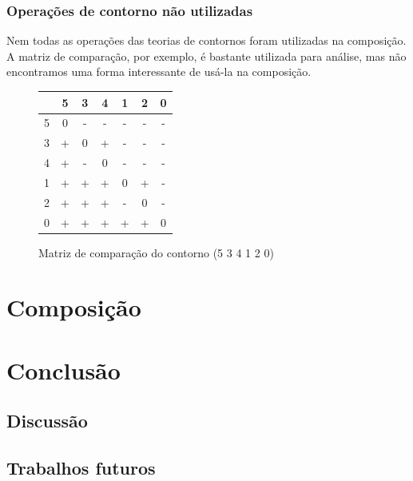 \subsection{Operações de contorno não utilizadas}
\label{sec:oper-de-cont}

Nem todas as operações das teorias de contornos foram utilizadas na
composição. A matriz de comparação, por exemplo, é bastante utilizada para
análise, mas não encontramos uma forma interessante de usá-la na
composição.

\begin{figure}
  \centering
  \begin{tabular}{r|cccccc}
      & 5 & 3 & 4 & 1 & 2 & 0 \\
      \hline
    5 & 0 & - & - & - & - & - \\
    3 & + & 0 & + & - & - & - \\
    4 & + & - & 0 & - & - & - \\
    1 & + & + & + & 0 & + & - \\
    2 & + & + & + & - & 0 & - \\
    0 & + & + & + & + & + & 0
  \end{tabular}
  \caption{Matriz de comparação do contorno (5 3 4 1 2 0)}
  \label{fig:matriz-534120}
\end{figure}

\chapter{Composição}
\label{cha:composicao}



\chapter{Conclusão}
\label{cha:conclusao}

\section{Discussão}
\label{sec:discussao}

\section{Trabalhos futuros}
\label{sec:trabalhos-futuros}
